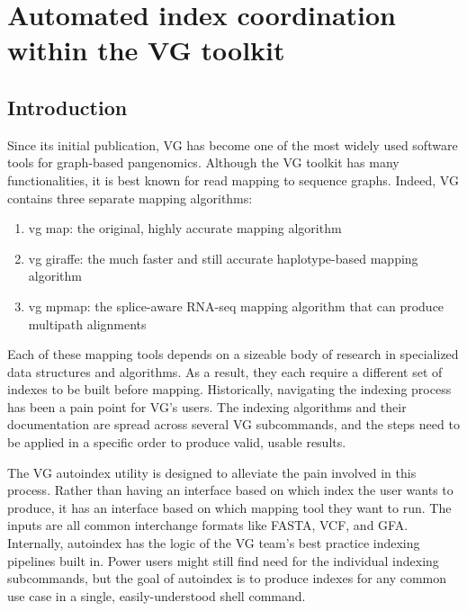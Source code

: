 \documentclass[11pt]{ucthesis}
\begin{document}
\chapter{Automated index coordination within the VG toolkit}
\label{chapter:autoindex}

\section{Introduction}

Since its initial publication, VG\cite{garrison2018variation} has become one of the most widely used software tools for graph-based pangenomics. Although the VG toolkit has many functionalities, it is best known for read mapping to sequence graphs. Indeed, VG contains three separate mapping algorithms:

\begin{enumerate}
\item vg map: the original, highly accurate mapping algorithm\cite{garrison2018variation}
\item vg giraffe: the much faster and still accurate haplotype-based mapping algorithm\cite{siren2020genotyping}
\item vg mpmap: the splice-aware RNA-seq mapping algorithm that can produce multipath alignments\cite{sibbesen2021haplotype}
\end{enumerate} 

Each of these mapping tools depends on a sizeable body of research in specialized data structures and algorithms\cite{siren2017indexing,chang2020distance,siren2020haplotype,eizenga2020efficient}. As a result, they each require a different set of indexes to be built before mapping. Historically, navigating the indexing process has been a pain point for VG's users. The indexing algorithms and their documentation are spread across several VG subcommands, and the steps need to be applied in a specific order to produce valid, usable results.

The VG autoindex utility is designed to alleviate the pain involved in this process. Rather than having an interface based on which index the user wants to produce, it has an interface based on which mapping tool they want to run. The inputs are all common interchange formats like FASTA, VCF, and GFA. Internally, autoindex has the logic of the VG team's best practice indexing pipelines built in. Power users might still find need for the individual indexing subcommands, but the goal of autoindex is to produce indexes for any common use case in a single, easily-understood shell command.
\end{document}
